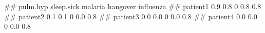\begin{Schunk}
% --begin: "comp.quant.atleast"
\begin{Soutput}
##          pulm.hyp sleep.sick malaria hangover influenza
## patient1      0.9        0.8       0      0.8       0.8
## patient2      0.1        0.1       0      0.0       0.8
## patient3      0.0        0.0       0      0.0       0.8
## patient4      0.0        0.0       0      0.0       0.8
\end{Soutput}
%
% --end: "comp.quant.atleast"
\end{Schunk}

